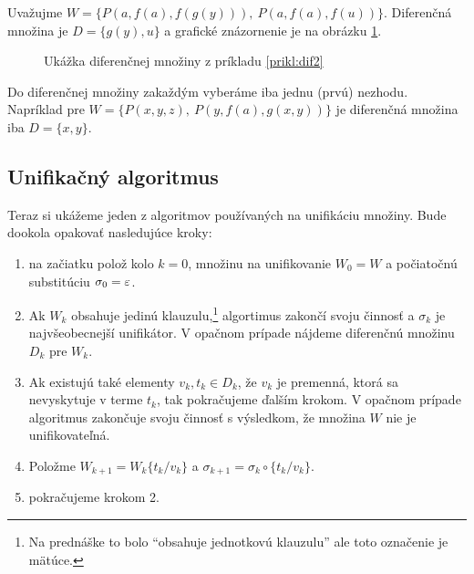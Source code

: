 \begin{priklad}
    \label{prikl:dif2}
    Uvažujme $W=\{P(a,f(a),f(g(y))),\ P(a,f(a),f(u))\}$.
    Diferenčná množina je $D=\{g(y),u\}$ a grafické znázornenie je na
    obrázku \ref{fig:dif2}.
    \begin{figure}[h]
        \centering

        \caption{Ukážka diferenčnej množiny z príkladu \ref{prikl:dif2}}
        \label{fig:dif2}
    \end{figure}
\end{priklad}

\begin{poznamka}
    Do diferenčnej množiny zakaždým vyberáme iba jednu (prvú) nezhodu.
    Napríklad pre $W=\{P(x,y,z),\ P(y,f(a),g(x,y))\}$ je diferenčná množina
    iba $D=\{x,y\}$.
\end{poznamka}

\subsection{Unifikačný algoritmus}

Teraz si ukážeme jeden z algoritmov používaných na unifikáciu množiny. Bude
dookola opakovať nasledujúce kroky:
\begin{enumerate}
    \item na začiatku polož kolo $k=0$, množinu na unifikovanie 
        $W_0 = W$ a počiatočnú substitúciu  $\sigma_0 = \varepsilon$.

    \item Ak $W_k$ obsahuje jedinú klauzulu,\footnote{Na prednáške
        to bolo ``obsahuje jednotkovú klauzulu'' ale toto označenie je
        mätúce.} algortimus zakončí svoju činnosť
        a $\sigma_k$ je najvšeobecnejší unifikátor.
        V opačnom prípade nájdeme diferenčnú množinu $D_k$ pre $W_k$.

    \item Ak existujú také elementy $v_k,t_k \in D_k$, že $v_k$ je
        premenná, ktorá sa nevyskytuje v terme $t_k$, tak pokračujeme ďalším
        krokom.
        V opačnom prípade algoritmus zakončuje svoju činnosť
        s výsledkom, že množina $W$ nie je unifikovateľná.

    \item Položme $W_{k+1} = W_k \{t_k/v_k\}$ a
        $\sigma_{k+1} = \sigma_k \circ \{t_k/v_k\}$. 

    \item pokračujeme krokom 2.
\end{enumerate}

